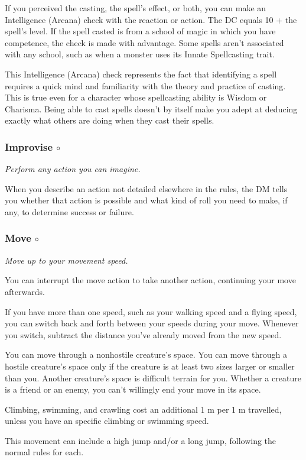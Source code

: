     If you perceived the casting, the spell's effect, or both, you can make an Intelligence (Arcana) check with the reaction or action.
    The DC equals 10 + the spell's level.
    If the spell casted is from a school of magic in which you have competence, the check is made with advantage.
    Some spells aren't associated with any school, such as when a monster uses its Innate Spellcasting trait.

    This Intelligence (Arcana) check represents the fact that identifying a spell requires a quick mind and familiarity with the theory and practice of casting.
    This is true even for a character whose spellcasting ability is Wisdom or Charisma.
    Being able to cast spells doesn't by itself make you adept at deducing exactly what others are doing when they cast their spells.
\subsubsection{Improvise $\circ$} \label{act::improvise}
    \textit{Perform any action you can imagine.}

    When you describe an action not detailed elsewhere in the rules, the DM tells you whether that action is possible and what kind of roll you need to make, if any, to determine success or failure.
\subsubsection{Move $\circ$} \label{act::move}
    \textit{Move up to your movement speed.}

    You can interrupt the move action to take another action, continuing your move afterwards.

    If you have more than one speed, such as your walking speed and a flying speed, you can switch back and forth between your speeds during your move.
    Whenever you switch, subtract the distance you've already moved from the new speed.

    You can move through a nonhostile creature's space.
    You can move through a hostile creature's space only if the creature is at least two sizes larger or smaller than you.
    Another creature's space is difficult terrain for you.
    Whether a creature is a friend or an enemy, you can't willingly end your move in its space.

    Climbing, swimming, and crawling cost an additional 1 m per 1 m travelled, unless you have an specific climbing or swimming speed.

    This movement can include a high jump and/or a long jump, following the normal rules for each.
